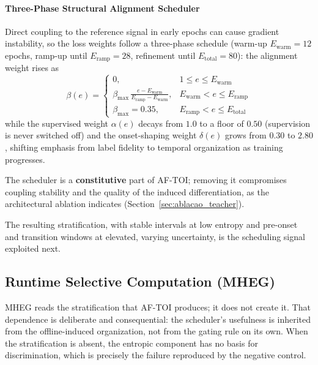 \documentclass[a4paper,fleqn]{cas-dc}
\newcommand{\AFTOI}{\mbox{AF-TOI}\xspace}
\newcommand{\MHEG}{\mbox{MHEG}\xspace}
\begin{document}
\paragraph{Three-Phase Structural Alignment Scheduler}
{\color{\revcolor}Direct coupling to the reference signal in early epochs can
cause gradient instability, so the loss weights follow a three-phase schedule
(warm-up $E_{\text{warm}}{=}12$ epochs, ramp-up until
$E_{\text{ramp}}{=}28$, refinement until $E_{\text{total}}{=}80$): the
alignment weight rises as
\begin{equation}
\beta(e)=
\begin{cases}
0, & 1 \leq e \leq E_{\text{warm}} \\[6pt]
\displaystyle\beta_{\max}\,\frac{e - E_{\text{warm}}}{E_{\text{ramp}} -
E_{\text{warm}}}, & E_{\text{warm}} < e \leq E_{\text{ramp}} \\[10pt]
\beta_{\max} = 0.35, & E_{\text{ramp}} < e \leq E_{\text{total}}
\end{cases}
\label{eq:scheduler_aftoi}
\end{equation}
while the supervised weight $\alpha(e)$ decays from $1.0$ to a floor of
$0.50$ (supervision is never switched off) and the onset-shaping weight
$\delta(e)$ grows from $0.30$ to $2.80$, shifting emphasis from label fidelity
to temporal organization as training progresses.}

The scheduler is a \textbf{constitutive} part of \AFTOI; removing it compromises
coupling stability and the quality of the induced differentiation, as the
architectural ablation indicates (Section~\ref{sec:ablacao_teacher}).

The resulting stratification, with stable intervals at low entropy and pre-onset and transition windows at elevated, varying uncertainty, is the scheduling signal exploited next.
\subsection{Runtime Selective Computation (\mbox{MHEG})}
\label{sec:mheg}
\MHEG reads the stratification that \AFTOI produces; it does not create it. That
dependence is deliberate and consequential: the scheduler's usefulness is inherited
from the offline-induced organization, not from the gating rule on its own. {\color{\revcolor}When the stratification is absent, the entropic component has no basis for discrimination, which is precisely the failure reproduced by the negative control.}
\end{document}
